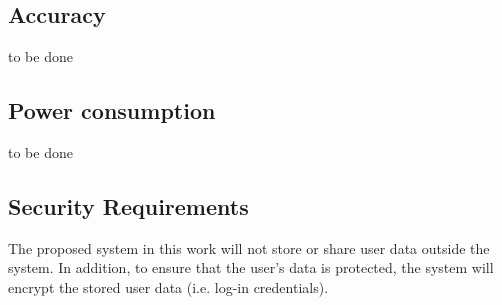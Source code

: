     \subsection{Accuracy}
    to be done
    
    \subsection{Power consumption}
    to be done 
    
    \subsection{Security Requirements}
    The proposed system in this work will not store or share user data outside the system. In addition, to ensure that the user's data is protected, the system will encrypt the stored user data (i.e. log-in credentials). 
    
    
    